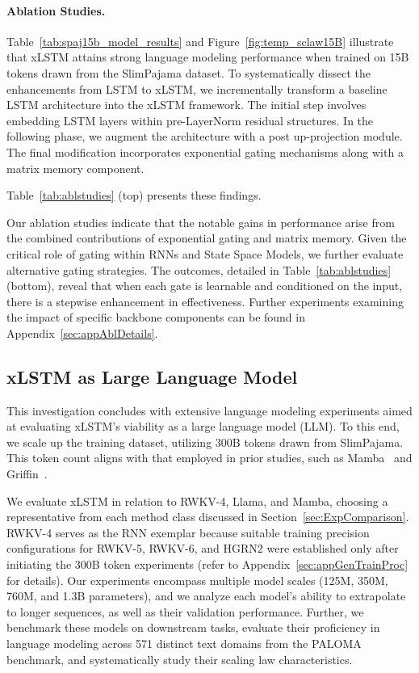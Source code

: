 \paragraph{Ablation Studies.}
Table~\ref{tab:spaj15b_model_results} and Figure~\ref{fig:temp_sclaw15B} illustrate that xLSTM attains strong language modeling performance when trained on 15B tokens drawn from the SlimPajama dataset. To systematically dissect the enhancements from LSTM to xLSTM, we incrementally transform a baseline LSTM architecture into the xLSTM framework. The initial step involves embedding LSTM layers within pre-LayerNorm residual structures. In the following phase, we augment the architecture with a post up-projection module. The final modification incorporates exponential gating mechanisms along with a matrix memory component.

Table~\ref{tab:ablstudies} (top) presents these findings.

Our ablation studies indicate that the notable gains in performance arise from the combined contributions of exponential gating and matrix memory. Given the critical role of gating within RNNs and State Space Models, we further evaluate alternative gating strategies. The outcomes, detailed in Table~\ref{tab:ablstudies} (bottom), reveal that when each gate is learnable and conditioned on the input, there is a stepwise enhancement in effectiveness. Further experiments examining the impact of specific backbone components can be found in Appendix~\ref{sec:appAblDetails}.

\subsection{xLSTM as Large Language Model}
\label{sec:ExpLanguage}

This investigation concludes with extensive language modeling experiments aimed at evaluating xLSTM's viability as a large language model (LLM). To this end, we scale up the training dataset, utilizing 300B tokens drawn from SlimPajama. This token count aligns with that employed in prior studies, such as Mamba~\citep{Gu:24arxiv} and Griffin~\citep{De:24arxiv}.

We evaluate xLSTM in relation to RWKV-4, Llama, and Mamba, choosing a representative from each method class discussed in Section~\ref{sec:ExpComparison}. RWKV-4 serves as the RNN exemplar because suitable training precision configurations for RWKV-5, RWKV-6, and HGRN2 were established only after initiating the 300B token experiments (refer to Appendix~\ref{sec:appGenTrainProc} for details). Our experiments encompass multiple model scales (125M, 350M, 760M, and 1.3B parameters), and we analyze each model's ability to extrapolate to longer sequences, as well as their validation performance. Further, we benchmark these models on downstream tasks, evaluate their proficiency in language modeling across 571 distinct text domains from the PALOMA benchmark, and systematically study their scaling law characteristics.

